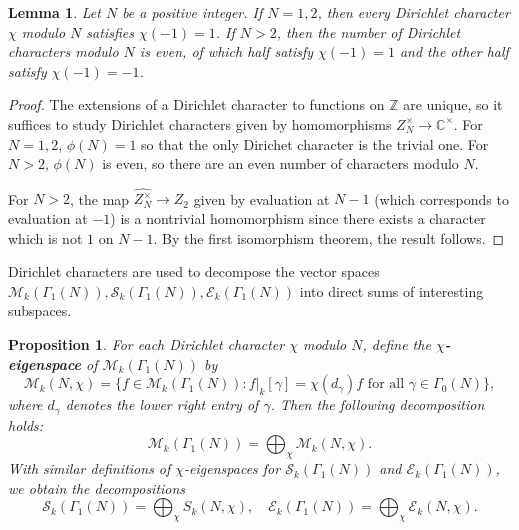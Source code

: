 \documentclass[10pt,leqno,twoside]{article}
\theoremstyle{plain}
\newtheorem{lemma}[lem]{Lemma}
\newtheorem{proposition}[lem]{Proposition}
\theoremstyle{definition}
\numberwithin{equation}{section}
\numberwithin{lem}{section}
\newcommand{\textib}[1]{\textbf{\textit{#1\index{#1}}}} %
\newcommand{\tbd}{{\Huge\color{red}{\textib{TO DO}}}}
\begin{document}
\begin{lemma}
    Let $N$ be a positive integer. If $N = 1,2$, then every Dirichlet character $\chi$ modulo $N$ satisfies $\chi(-1)=1$. If $N>2$, then the number of Dirichlet characters modulo $N$ is even, of which half satisfy $\chi(-1) = 1$ and the other half satisfy $\chi(-1) = -1$.
\end{lemma}
\begin{proof}
    The extensions of a Dirichlet character to functions on $\mathbb Z$ are unique, so it suffices to study Dirichlet characters given by homomorphisms $Z_N^\times\to\mathbb C^\times$. For $N = 1,2$, $\phi(N) = 1$ so that the only Dirichet character is the trivial one. For $N>2$, $\phi(N)$ is even, so there are an even number of characters modulo $N$.

    For $N>2$, the map $\widehat{Z_N^\times}\to Z_2$ given by evaluation at $N-1$ (which corresponds to evaluation at $-1$) is a nontrivial homomorphism since there exists a character which is not $1$ on $N-1$. By the first isomorphism theorem, the result follows.
\end{proof}
Dirichlet characters are used to decompose the vector spaces $\mathcal M_k(\varGamma_1(N)), \mathcal S_k(\varGamma_1(N)), \mathcal E_k(\varGamma_1(N))$ into direct sums of interesting subspaces.
\begin{proposition}\label{prop: eigenspace decomp}
    For each Dirichlet character $\chi$ modulo $N$, define the \textib{$\chi$-eigenspace} of $\mathcal M_k(\varGamma_1(N))$ by 
    \[\mathcal M_k(N,\chi) = \{f\in \mathcal M_k(\varGamma_1(N)) : f|_k[\gamma] = \chi(d_\gamma)f \text{ for all } \gamma\in\varGamma_0(N)\},\] where $d_\gamma$ denotes the lower right entry of $\gamma$. Then the following decomposition holds:
    \[\mathcal M_k(\varGamma_1(N)) = \bigoplus_\chi\mathcal M_k(N,\chi).\] With similar definitions of $\chi$-eigenspaces for $\mathcal S_k(\varGamma_1(N))$ and $\mathcal E_k(\varGamma_1(N))$, we obtain the decompositions
    \[\mathcal S_k(\varGamma_1(N)) = \bigoplus_\chi S_k(N,\chi),\quad \mathcal E_k(\varGamma_1(N)) = \bigoplus_\chi \mathcal E_k(N,\chi).\]
\end{proposition}
\end{document}
